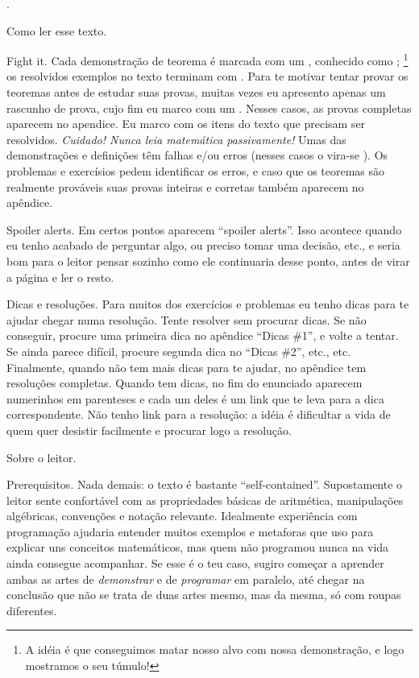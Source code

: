 
\chapteroid \prefacename.

\sectionoid Como ler esse texto.

\blah Fight it.
Cada demonstração de teorema é marcada com um \symq{$\qedsymbol$},
conhecido como ;%
\footnote{A idéia é que conseguimos matar nosso alvo com nossa demonstração,
e logo mostramos o seu túmulo!}
os resolvidos exemplos no texto terminam com \symq{$\qexsymbol$}.
Para te motivar tentar provar os teoremas antes de estudar suas provas,
muitas vezes eu apresento apenas um rascunho de prova,
cujo fim eu marco com um \symq{$\qessymbol$}.
Nesses casos, as provas completas aparecem no apendice.
Eu marco com \symq{$\activitysymbol$} os itens do texto que
precisam ser resolvidos.
\endgraf
\emph{Cuidado! Nunca leia matemática passivamente!}
Umas das demonstrações e definições têm falhas e/ou erros
(nesses casos o \symq{$\qedsymbol$} vira-se \symq{$\mistakesymbol$}).
Os problemas e exercísios pedem identificar os erros,
e caso que os teoremas são realmente prováveis suas provas
inteiras e corretas também aparecem no apêndice.

\blah Spoiler alerts.
Em certos pontos aparecem ``spoiler alerts''.
Isso acontece quando eu tenho acabado de perguntar algo, ou preciso
tomar uma decisão, etc., e seria bom para o leitor pensar sozinho
como ele continuaria desse ponto, antes de virar a página
e ler o resto.

\blah Dicas e resoluções.
Para muitos dos exercícios e problemas eu tenho dicas para te ajudar
chegar numa resolução.  Tente resolver sem procurar dicas.
Se não conseguir, procure uma primeira dica no apêndice ``Dicas \#1'',
e volte a tentar.
Se ainda parece difícil, procure segunda dica no ``Dicas \#2'', etc., etc.
Finalmente, quando não tem mais dicas para te ajudar,
no apêndice tem resoluções completas.
Quando tem dicas, no fim do enunciado aparecem numerinhos em parenteses
e cada um deles é um link que te leva para a dica correspondente.
Não tenho link para a resolução: a idéia é dificultar a vida de quem
quer desistir facilmente e procurar logo a resolução.

\endsectionoid

\sectionoid Sobre o leitor.

\blah Prerequisitos.
Nada demais: o texto é bastante ``self-contained''.
Supostamente o leitor sente confortável com as propriedades básicas
de aritmética, manipulações algébricas, convenções e notação relevante.
Idealmente experiência com programação ajudaria entender muitos exemplos
e metaforas que uso para explicar uns conceitos matemáticos, mas quem
não programou nunca na vida ainda consegue acompanhar.
Se esse é o teu caso, sugiro começar a aprender ambas as artes de
\emph{demonstrar} e de \emph{programar} em paralelo, até chegar
na conclusão que não se trata de duas artes mesmo, mas da mesma,
só com roupas diferentes.

\endsectionoid

\endchapteroid
